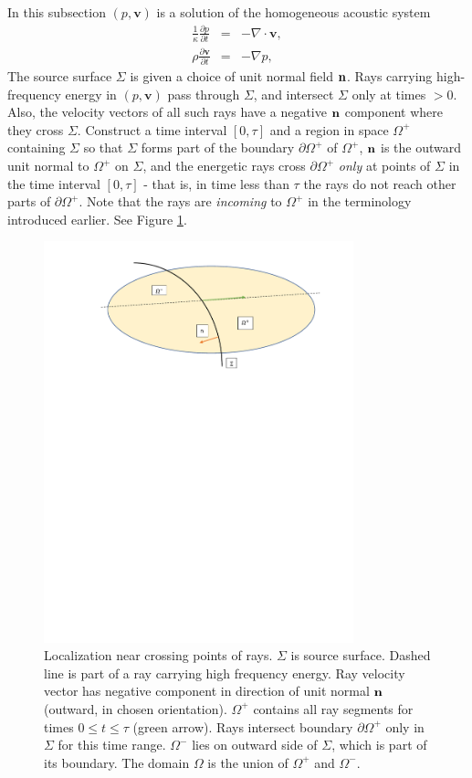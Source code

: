 \documentclass[12pt]{geophysics}
\newcommand{\bv}{\mathbf{v}}
\begin{document}
In this subsection $(p,\bv)$ is a solution of the homogeneous acoustic system
\begin{eqnarray}
\label{eqn:awefree}
  \frac{1}{\kappa}\frac{\partial p}{\partial t} & = & - \nabla \cdot \bv, \nonumber \\
  \rho\frac{\partial \bv}{\partial t} & = & - \nabla p,
\end{eqnarray}
The source surface $\Sigma$ is given a choice of unit normal field ${\bf
  n}$. Rays carrying
high-frequency energy in $(p,\bv)$ pass through $\Sigma$, and
intersect $\Sigma$ only at times
$>0$. Also, the velocity
vectors of all such rays have a negative ${\bf n}$ component where
they cross $\Sigma$. Construct a time interval $[0,\tau]$ and
a region in space $\Omega^+$ containing $\Sigma$ so that $\Sigma$ forms
part of the boundary $\partial \Omega^+$ of $\Omega^+$, ${\bf n}$ is the
outward unit normal to $\Omega^+$ on $\Sigma$, and the energetic
rays cross $\partial \Omega^+$ {\em only} at
points of $\Sigma$ in the time interval $[0,\tau]$ - that is, in time
less than $\tau$ the rays do not reach other parts of $\partial
\Omega^+$. Note that the rays are {\em incoming} to $\Omega^+$ in the terminology
introduced earlier. See Figure \ref{fig:omegarays}.

\begin{figure}
  \centering
  \includegraphics[width=0.8\textwidth]{omegarays.pdf}
  \caption{Localization near crossing points of rays. $\Sigma$ is
    source surface.  Dashed line is part of a ray carrying high
    frequency energy. Ray velocity vector has negative component in
    direction of unit normal ${\bf n}$ (outward, in chosen
    orientation). $\Omega^+$ contains all ray segments for times
    $0 \le t \le \tau$ (green arrow). Rays intersect boundary
    $\partial \Omega^+$ only in $\Sigma$ for this time
    range. $\Omega^-$ lies on outward side of $\Sigma$, which is part
    of its boundary. The domain $\Omega$ is the union of $\Omega^+$
    and $\Omega^-$.}
  \label{fig:omegarays}
\end{figure}
\end{document}
